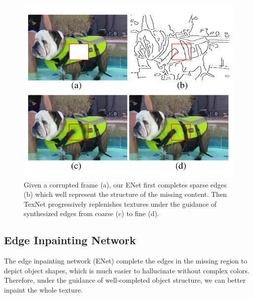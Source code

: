 \begin{figure}[t]
	\centering
	\includegraphics[width=0.8\columnwidth]{coars-fine} %
	\caption{Given a corrupted frame (a), our ENet first completes sparse edges (b) which well represent the structure of the missing content. Then TexNet progressively replenishes textures under the guidance of synthesized edges from coarse (c) to fine (d).}
	
	\label{fig:coarse-fine}
\end{figure}

\subsection{Edge Inpainting Network}
\label{sec:edgenet}
The edge inpainting network (ENet) complete the edges in the missing region to depict object shapes, which is much easier to hallucinate without complex colors.
Therefore, under the guidance of well-completed object structure, we can better inpaint the whole texture.
 


